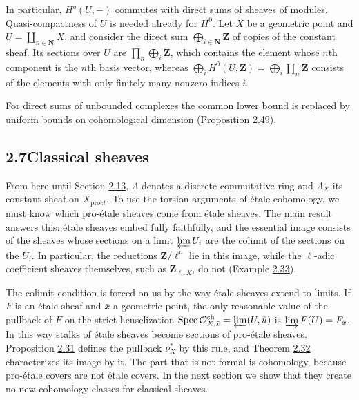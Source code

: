 \documentclass[11pt]{article}
\begin{document}
\label{bp88}%
In particular, \(H^q(U,-)\) commutes with direct sums of sheaves of modules. Quasi-compactness of \(U\) is needed already for \(H^0\). Let \(X\) be a geometric point and \(U=\coprod_{n\in\mathbf N}X\), and consider the direct sum \(\bigoplus_{i\in\mathbf N}\mathbf Z\) of copies of the constant sheaf. Its sections over \(U\) are \(\prod_n\bigoplus_i\mathbf Z\), which contains the element whose \(n\)th component is the \(n\)th basis vector, whereas \(\bigoplus_i H^0(U,\mathbf Z)=\bigoplus_i\prod_n\mathbf Z\) consists of the elements with only finitely many nonzero indices \(i\).

For direct sums of unbounded complexes the common lower bound is replaced by uniform bounds on cohomological dimension (Proposition \hyperref[bp146]{2.49}).


\subsection*{\texorpdfstring{2.7\quad Classical sheaves}{2.7 Classical sheaves}}
\label{bp89}%
\label{bp90}%
From here until Section \hyperref[bp170]{2.13}, \(\Lambda\) denotes a discrete commutative ring and \(\Lambda_X\) its constant sheaf on \(X_{\mathrm{pro}\acute{e}t}\). To use the torsion arguments of étale cohomology, we must know which pro-étale sheaves come from étale sheaves. The main result answers this: étale sheaves embed fully faithfully, and the essential image consists of the sheaves whose sections on a limit \(\varprojlim U_i\) are the colimit of the sections on the \(U_i\). In particular, the reductions \(\mathbf Z/\ell^n\) lie in this image, while the \(\ell\)-adic coefficient sheaves themselves, such as \(\mathbf Z_{\ell,X}\), do not (Example \hyperref[bp97]{2.33}).

The colimit condition is forced on us by the way étale sheaves extend to limits. If \(F\) is an étale sheaf and \(\bar x\) a geometric point, the only reasonable value of the pullback of \(F\) on the strict henselization \(\operatorname{Spec}\mathcal O^{\mathrm{sh}}_{X,\bar x}=\varprojlim(U,\bar u)\) is \(\varinjlim F(U)=F_{\bar x}\). In this way stalks of étale sheaves become sections of pro-étale sheaves. Proposition \hyperref[bp92]{2.31} defines the pullback \(\nu_X^*\) by this rule, and Theorem \hyperref[bp95]{2.32} characterizes its image by it. The part that is not formal is cohomology, because pro-étale covers are not étale covers. In the next section we show that they create no new cohomology classes for classical sheaves.
\end{document}
